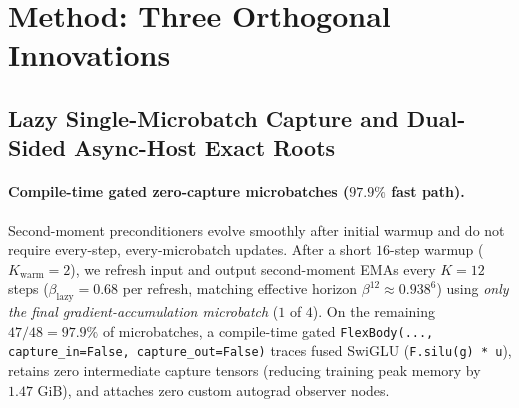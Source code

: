 \documentclass[11pt]{article}
\begin{document}
\section{Method: Three Orthogonal Innovations}
\label{sec:method}

\subsection{Lazy Single-Microbatch Capture and Dual-Sided Async-Host Exact Roots}
\label{sec:lazy}

\paragraph{Compile-time gated zero-capture microbatches ($97.9\%$ fast path).}
Second-moment preconditioners evolve smoothly after initial warmup and do not require every-step, every-microbatch updates. After a short $16$-step warmup ($K_{\mathrm{warm}} = 2$), we refresh input and output second-moment EMAs every $K = 12$ steps ($\beta_{\mathrm{lazy}} = 0.68$ per refresh, matching effective horizon $\beta^{12} \approx 0.938^6$) using \emph{only the final gradient-accumulation microbatch} ($1$ of $4$). On the remaining $47/48 = 97.9\%$ of microbatches, a compile-time gated \texttt{FlexBody(..., capture\_in=False, capture\_out=False)} traces fused SwiGLU (\texttt{F.silu(g) * u}), retains zero intermediate capture tensors (reducing training peak memory by $1.47\text{ GiB}$), and attaches zero custom autograd observer nodes.
\end{document}
